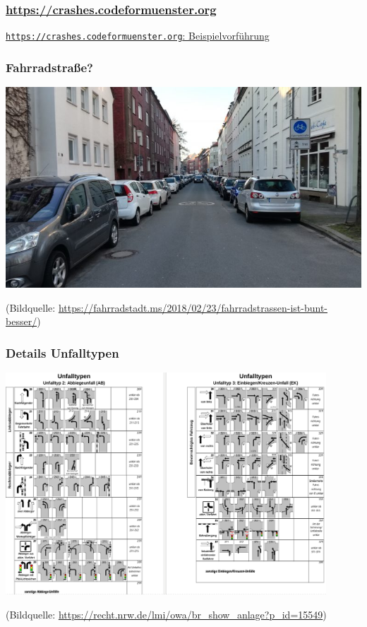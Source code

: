 \documentclass{beamer}
\begin{document}
\begin{frame}
  \frametitle{\url{https://crashes.codeformuenster.org}}
  
  \href{beispielpraesentation-crashes.mkv}{\texttt{https://crashes.codeformuenster.org}: Beispielvorführung}
  
\end{frame}

\begin{frame}
  \frametitle{Fahrradstraße?}
  
  \includegraphics[width=\textwidth]{img/schillerstrasse.jpg}
  
    {\scriptsize (Bildquelle: \url{https://fahrradstadt.ms/2018/02/23/fahrradstrassen-ist-bunt-besser/})\par}
\end{frame}

\begin{frame}
  \frametitle{Details Unfalltypen}
  \centering
  
  \includegraphics[width=0.9\textwidth]{img/unfalltyp-details.png}
  
  {\scriptsize (Bildquelle: \url{https://recht.nrw.de/lmi/owa/br_show_anlage?p_id=15549})\par}
\end{frame}
\end{document}
